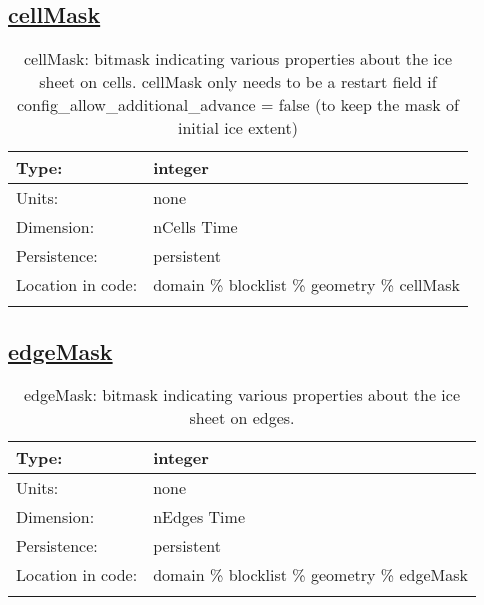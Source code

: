 \subsection[cellMask]{\hyperref[sec:var_tab_geometry]{cellMask}}
\label{subsec:var_sec_geometry_cellMask}
\begin{center}
\begin{longtable}{| p{2.0in} | p{4.0in} |}
        \hline 
        Type: & integer \\
        \hline 
        Units: & \si{none} \\
        \hline 
        Dimension: & nCells Time \\
        \hline 
        Persistence: & persistent \\
        \hline 
         Location in code: & domain \% blocklist \% geometry \% cellMask \\
         \hline 
    \caption{cellMask: bitmask indicating various properties about the ice sheet on cells.  cellMask only needs to be a restart field if config\_allow\_additional\_advance = false (to keep the mask of initial ice extent)}
\end{longtable}
\end{center}
\subsection[edgeMask]{\hyperref[sec:var_tab_geometry]{edgeMask}}
\label{subsec:var_sec_geometry_edgeMask}
\begin{center}
\begin{longtable}{| p{2.0in} | p{4.0in} |}
        \hline 
        Type: & integer \\
        \hline 
        Units: & \si{none} \\
        \hline 
        Dimension: & nEdges Time \\
        \hline 
        Persistence: & persistent \\
        \hline 
         Location in code: & domain \% blocklist \% geometry \% edgeMask \\
         \hline 
    \caption{edgeMask: bitmask indicating various properties about the ice sheet on edges.}
\end{longtable}
\end{center}
